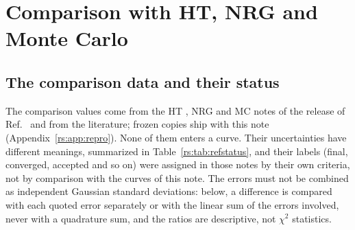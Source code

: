 \section{Comparison with HT, NRG and Monte Carlo}\label{rs:sec:compare}
\subsection{The comparison data and their status}
The comparison values come from the HT \cite{rs:noteHT}, NRG \cite{rs:noteNRG} and MC
\cite{rs:noteMC} notes of the release of Ref.~\cite{rs:LRIpaper} and from the literature; frozen
copies ship with this note (Appendix~\ref{rs:app:repro}). None of them enters a curve. Their
uncertainties have different meanings, summarized in Table~\ref{rs:tab:refstatus}, and their
labels (final, converged, accepted and so on) were assigned in those notes by their own
criteria, not by comparison with the curves of this note. The errors must not be combined as
independent Gaussian standard deviations: below, a difference is compared with each quoted
error separately or with the linear sum of the errors involved, never with a quadrature sum,
and the ratios are descriptive, not $\chi^2$ statistics.

